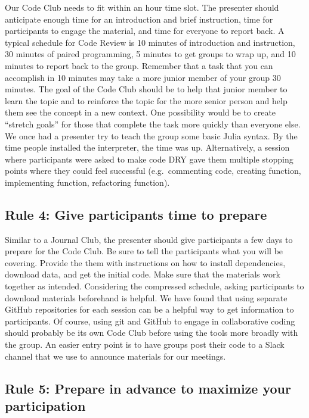 \documentclass[
  11pt,
]{article}
\begin{document}
Our Code Club needs to fit within an hour time slot. The presenter
should anticipate enough time for an introduction and brief instruction,
time for participants to engage the material, and time for everyone to
report back. A typical schedule for Code Review is 10 minutes of
introduction and instruction, 30 minutes of paired programming, 5
minutes to get groups to wrap up, and 10 minutes to report back to the
group. Remember that a task that you can accomplish in 10 minutes may
take a more junior member of your group 30 minutes. The goal of the Code
Club should be to help that junior member to learn the topic and to
reinforce the topic for the more senior person and help them see the
concept in a new context. One possibility would be to create ``stretch
goals'' for those that complete the task more quickly than everyone
else. We once had a presenter try to teach the group some basic Julia
syntax. By the time people installed the interpreter, the time was up.
Alternatively, a session where participants were asked to make code DRY
gave them multiple stopping points where they could feel successful
(e.g.~commenting code, creating function, implementing function,
refactoring function).

\hypertarget{rule-4-give-participants-time-to-prepare}{%
\subsection{Rule 4: Give participants time to
prepare}\label{rule-4-give-participants-time-to-prepare}}

Similar to a Journal Club, the presenter should give participants a few
days to prepare for the Code Club. Be sure to tell the participants what
you will be covering. Provide the them with instructions on how to
install dependencies, download data, and get the initial code. Make sure
that the materials work together as intended. Considering the compressed
schedule, asking participants to download materials beforehand is
helpful. We have found that using separate GitHub repositories for each
session can be a helpful way to get information to participants. Of
course, using git and GitHub to engage in collaborative coding should
probably be its own Code Club before using the tools more broadly with
the group. An easier entry point is to have groups post their code to a
Slack channel that we use to announce materials for our meetings.

\hypertarget{rule-5-prepare-in-advance-to-maximize-your-participation}{%
\subsection{Rule 5: Prepare in advance to maximize your
participation}\label{rule-5-prepare-in-advance-to-maximize-your-participation}}
\end{document}
